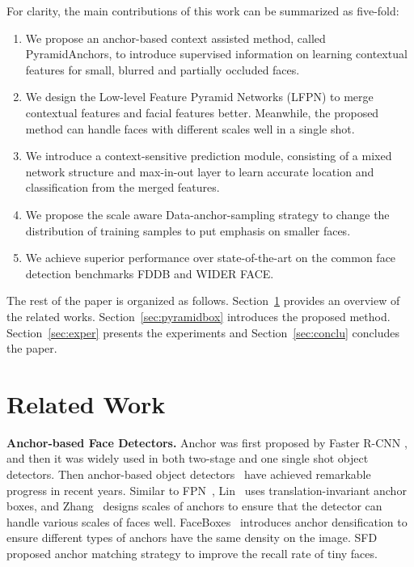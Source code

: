 \documentclass[runningheads]{llncs}
\begin{document}
For clarity, the main contributions of this work can be summarized as five-fold:
\begin{enumerate}
\item We propose an anchor-based context assisted method, called PyramidAnchors,
to introduce supervised information on learning contextual features for small, blurred and partially occluded faces.
\item We design the Low-level Feature Pyramid Networks (LFPN) to merge contextual features and facial features better. Meanwhile, the proposed method can handle faces with different scales well in a single shot.
\item We introduce a context-sensitive prediction module, consisting of a mixed network structure and max-in-out layer to learn accurate location and classification from the merged features.
\item We propose the scale aware Data-anchor-sampling strategy to change the distribution of training samples to put emphasis on smaller faces.
\item We achieve superior performance over state-of-the-art on the common face detection benchmarks
FDDB and WIDER FACE.
\end{enumerate}

The rest of the paper is organized as follows. Section~\ref{sec:relate} provides an
overview of the related works. Section~\ref{sec:pyramidbox} introduces the proposed method.
Section~\ref{sec:exper} presents the experiments and Section~\ref{sec:conclu} concludes the paper.


\section{Related Work}
\label{sec:relate}


\textbf{Anchor-based Face Detectors.}
Anchor was first proposed by Faster R-CNN \cite{Ren2015}, and then it was widely used in both two-stage and
one single shot object detectors.
Then anchor-based object detectors~\cite{Liu2016,Redmon2016} have achieved remarkable progress in recent years.
Similar to FPN~\cite{Lin2017}, Lin~\cite{Lin2017b} uses translation-invariant anchor boxes,
and Zhang~\cite{Zhang2017} designs scales of anchors to ensure that the detector can handle various scales of faces well.
FaceBoxes~\cite{Zhang2017b} introduces anchor densification to ensure different types of anchors
have the same density on the image. SFD~\cite{Zhang2017} proposed anchor matching strategy to improve the
recall rate of tiny faces.
\end{document}
